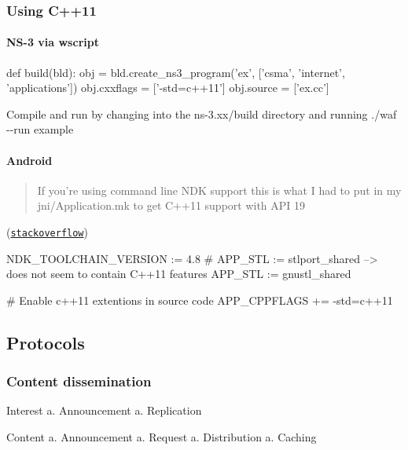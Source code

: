 \subsubsection*{Using C++11}

\paragraph*{N\-S-\/3 via {\ttfamily wscript}}

\begin{DoxyVerb}def build(bld):
  obj = bld.create_ns3_program('ex', ['csma', 'internet', 'applications'])
  obj.cxxflags = ['-std=c++11']
  obj.source = ['ex.cc']
\end{DoxyVerb}


Compile and run by changing into the {\ttfamily ns-\/3.\-xx/build} directory and running {\ttfamily ./waf -\/-\/run example}

\paragraph*{Android}

\begin{quotation}
If you're using command line N\-D\-K support this is what I had to put in my {\ttfamily jni/\-Application.\-mk} to get C++11 support with A\-P\-I 19

\end{quotation}


(\href{http://stackoverflow.com/a/21386866}{\tt stackoverflow}) \begin{DoxyVerb}NDK_TOOLCHAIN_VERSION := 4.8
# APP_STL := stlport_shared  --> does not seem to contain C++11 features
APP_STL := gnustl_shared

# Enable c++11 extentions in source code
APP_CPPFLAGS += -std=c++11
\end{DoxyVerb}


\subsection*{Protocols}

\subsubsection*{Content dissemination}


\begin{DoxyEnumerate}
\item Interest a. Announcement a. Replication
\end{DoxyEnumerate}
\begin{DoxyEnumerate}
\item Content a. Announcement a. Request a. Distribution a. Caching
\end{DoxyEnumerate}

